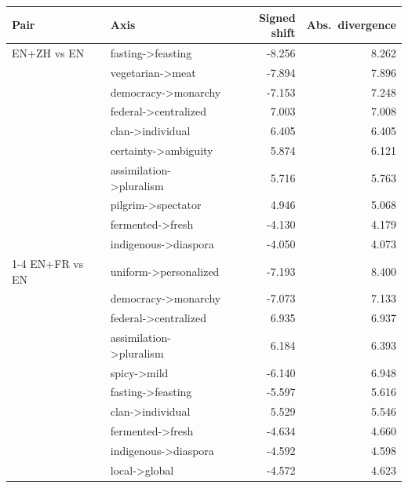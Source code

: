 \begin{tabular}{@{}llrr@{}}
\toprule
Pair & Axis & Signed shift & Abs.\ divergence \\
\midrule
EN+ZH vs EN & fasting->feasting & -8.256 & 8.262 \\
 & vegetarian->meat & -7.894 & 7.896 \\
 & democracy->monarchy & -7.153 & 7.248 \\
 & federal->centralized & 7.003 & 7.008 \\
 & clan->individual & 6.405 & 6.405 \\
 & certainty->ambiguity & 5.874 & 6.121 \\
 & assimilation->pluralism & 5.716 & 5.763 \\
 & pilgrim->spectator & 4.946 & 5.068 \\
 & fermented->fresh & -4.130 & 4.179 \\
 & indigenous->diaspora & -4.050 & 4.073 \\
\cmidrule(lr){1-4}
EN+FR vs EN & uniform->personalized & -7.193 & 8.400 \\
 & democracy->monarchy & -7.073 & 7.133 \\
 & federal->centralized & 6.935 & 6.937 \\
 & assimilation->pluralism & 6.184 & 6.393 \\
 & spicy->mild & -6.140 & 6.948 \\
 & fasting->feasting & -5.597 & 5.616 \\
 & clan->individual & 5.529 & 5.546 \\
 & fermented->fresh & -4.634 & 4.660 \\
 & indigenous->diaspora & -4.592 & 4.598 \\
 & local->global & -4.572 & 4.623 \\
\bottomrule
\end{tabular}
